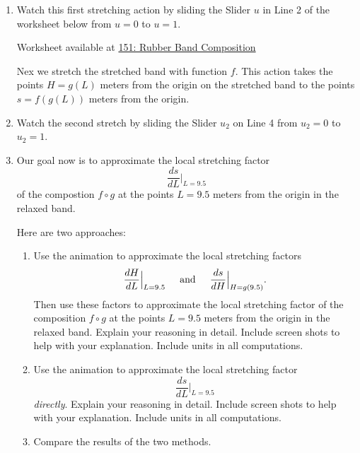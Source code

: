 \documentclass{ximera}
\begin{document}
\begin{enumerate}

\item Watch this first stretching action by sliding the Slider $u$ in Line 2 of the worksheet below from $u=0$ to $u=1$.

 

\begin{onlineOnly}
    \begin{center}
\end{center}
\end{onlineOnly}

Worksheet available at \href{https://www.desmos.com/calculator/8whlpa61hn}{151: Rubber Band Composition}



Nex we stretch the stretched band with function $f$. This action takes the points $H=g(L)$ meters from the origin on the stretched band to the points $s=f(g(L))$ meters from the origin. 

\item Watch the second stretch by sliding the Slider $u_2$ on Line 4 from $u_2=0$ to $u_2=1$.

\item Our goal now is to approximate the local stretching factor
\[
 \frac{ds}{dL} \Big|_{L=9.5}
\]
of the compostion $f\circ g$ at the points $L=9.5$ meters from the origin in the relaxed band.

Here are two approaches:

\begin{enumerate}
\item Use the animation to approximate the local stretching factors
\[
      \frac{dH}{dL}\Big|_{L=9.5} \hskip 0.2 in  \text{and} \hskip 0.2 in \frac{ds}{dH}\Big|_{H=g(9.5)}.
\]
Then use these factors to approximate the local stretching factor of the composition $f\circ g$ at the points $L=9.5$ meters from the origin in the relaxed band. Explain your reasoning in detail. Include screen shots to help with your explanation. Include units in all computations.
\begin{freeResponse}
\end{freeResponse}

\item Use the animation to approximate the local stretching factor
\[
  \frac{ds}{dL} \Big|_{L=9.5}
\]
\emph{directly}. Explain your reasoning in detail. Include screen shots to help with your explanation. Include units in all computations.
\begin{freeResponse}
\end{freeResponse}

\item Compare the results of the two methods.
\begin{freeResponse}
\end{freeResponse}

\end{enumerate}

 \end{enumerate}
\end{document}
